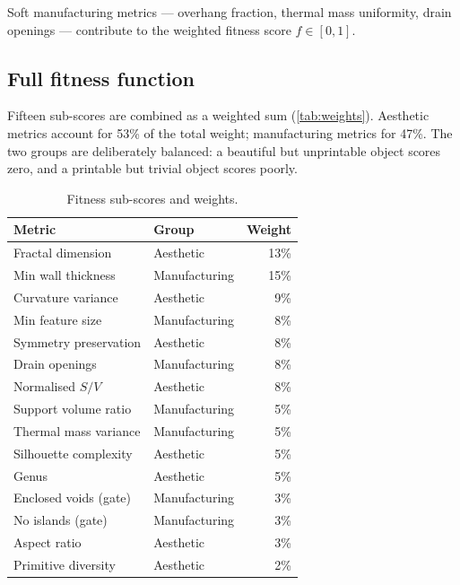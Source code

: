 \documentclass[11pt, a4paper]{article}
\begin{document}
Soft manufacturing metrics — overhang fraction, thermal mass uniformity,
drain openings — contribute to the weighted fitness score $f \in [0,1]$.

\subsection{Full fitness function}
\label{subsec:fitness_full}

Fifteen sub-scores are combined as a weighted sum (\autoref{tab:weights}).
Aesthetic metrics account for 53\% of the total weight;
manufacturing metrics for 47\%.
The two groups are deliberately balanced: a beautiful but unprintable object
scores zero, and a printable but trivial object scores poorly.

\begin{table}[h]
\centering
\caption{Fitness sub-scores and weights.}
\label{tab:weights}
\small
\begin{tabular}{llr}
\toprule
Metric & Group & Weight \\
\midrule
Fractal dimension       & Aesthetic       & 13\% \\
Min wall thickness      & Manufacturing   & 15\% \\
Curvature variance      & Aesthetic       &  9\% \\
Min feature size        & Manufacturing   &  8\% \\
Symmetry preservation   & Aesthetic       &  8\% \\
Drain openings          & Manufacturing   &  8\% \\
Normalised $S/V$        & Aesthetic       &  8\% \\
Support volume ratio    & Manufacturing   &  5\% \\
Thermal mass variance   & Manufacturing   &  5\% \\
Silhouette complexity   & Aesthetic       &  5\% \\
Genus                   & Aesthetic       &  5\% \\
Enclosed voids (gate)   & Manufacturing   &  3\% \\
No islands (gate)       & Manufacturing   &  3\% \\
Aspect ratio            & Aesthetic       &  3\% \\
Primitive diversity     & Aesthetic       &  2\% \\
\bottomrule
\end{tabular}
\end{table}
\end{document}
